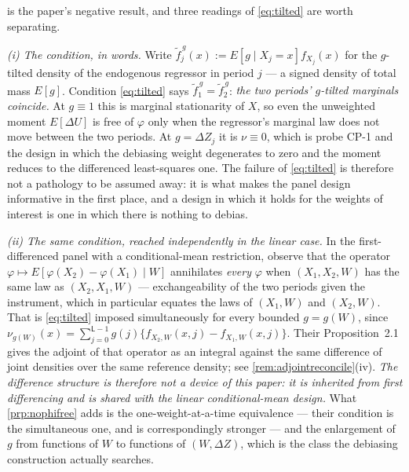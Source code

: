 \begin{remark}\label{rem:nophifree}
 is the paper's negative result, and three readings of \eqref{eq:tilted} are worth
separating.

\emph{(i) The condition, in words.} Write $\tilde f^{\,g}_j(x):=E[g\mid X_j=x]f_{X_j}(x)$ for the
$g$-tilted density of the endogenous regressor in period $j$ --- a signed density of total mass $E[g]$.
Condition \eqref{eq:tilted} says $\tilde f^{\,g}_1=\tilde f^{\,g}_2$: \emph{the two periods' $g$-tilted
marginals coincide.} At $g\equiv1$ this is marginal stationarity of $X$, so even the unweighted moment
$E[\Delta U]$ is free of $\varphi$ only when the regressor's marginal law does not move between the two
periods. At $g=\Delta Z_j$ it is $\nu\equiv0$, which is probe CP-1 and the design in which the debiasing
weight degenerates to zero and the moment reduces to the differenced least-squares one. The failure of
\eqref{eq:tilted} is therefore not a pathology to be assumed away: it is what makes the panel design
informative in the first place, and a design in which it holds for the weights of interest is one in
which there is nothing to debias.

\emph{(ii) The same condition, reached independently in the linear case.} In the first-differenced panel
with a conditional-mean restriction, \citet{feve2014} observe that the operator
$\varphi\mapsto E[\varphi(X_2)-\varphi(X_1)\mid W]$ annihilates \emph{every} $\varphi$ when
$(X_1,X_2,W)$ has the same law as $(X_2,X_1,W)$ --- exchangeability of the two periods given the
instrument, which in particular equates the laws of $(X_1,W)$ and $(X_2,W)$. That is \eqref{eq:tilted}
imposed simultaneously for every bounded $g=g(W)$, since
$\nu_{g(W)}(x)=\sum_{j=0}^{\mathsf L-1}g(j)\{f_{X_2,W}(x,j)-f_{X_1,W}(x,j)\}$. Their Proposition~2.1 gives the
adjoint of that operator as an integral against the same difference of joint densities over the same
reference density; see \cref{rem:adjointreconcile}(iv). \emph{The difference structure is therefore not a
device of this paper: it is inherited from first differencing and is shared with the linear
conditional-mean design.} What \cref{prp:nophifree} adds is the one-weight-at-a-time equivalence --- their
condition is the simultaneous one, and is correspondingly stronger --- and the enlargement of $g$ from
functions of $W$ to functions of $(W,\Delta Z)$, which is the class the debiasing construction actually
searches.


\end{remark}
